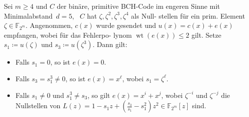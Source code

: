 \documentclass{cheat-sheet}
\newcommand{\F}{\mathbb{F}} %
\DeclareMathOperator{\wt}{wt} %
\begin{document}
\begin{satz}
  Sei $m \geq 4$ und $C$ der binäre, primitive BCH-Code im engeren Sinne mit Minimalabstand~$d = 5$, \dh{}~$C$ hat $\zeta, \zeta^2, \zeta^3, \zeta^4$ als Null- stellen für ein prim. Element $\zeta \in \F_{2^m}$.
  Angenommen, $c(x)$ wurde gesendet und $u(x) = c(x) + e(x)$ empfangen, wobei für das Fehlerpo- lynom $\wt(e(x)) \leq 2$ gilt.
  Setze $s_1 \coloneqq u(\zeta)$ und $s_3 \coloneqq u(\zeta^3)$.
  Dann gilt:
  \begin{itemize}
    \item Falls $s_1 = 0$, so ist $e(x) = 0$.
    \item Falls $s_3 = s_1^3 \neq 0$, so ist $e(x) = x^\ell$, wobei $s_1 = \zeta^\ell$.
    \item Falls $s_1 \neq 0$ und $s_1^3 \neq s_3$, so gilt $e(x) = x^i + x^j$, wobei $\zeta^{-i}$ und $\zeta^{-j}$ die Nullstellen von $L(z) = 1 - s_1 z + (\tfrac{s_3}{s_1} - s_1^2) z^2 \in \F_{2^m}[z]$ sind.
  \end{itemize}
\end{satz}


\end{document}
